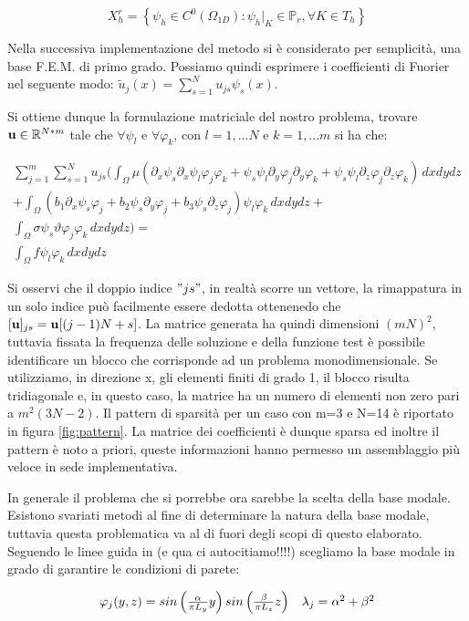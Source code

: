 \begin{displaymath}
X_h^r= \left\{\psi_h \in C^0(\Omega_{1D}): \psi_h \vert_K  \in \mathbb{P}_r,\forall K\in T_h \right\}
\end{displaymath}

 Nella successiva implementazione del metodo si \`e considerato per semplicit\`a, una base F.E.M. di primo grado. Possiamo quindi esprimere i coefficienti di Fuorier nel seguente modo: $\tilde{u}_j(x)=\sum_{s=1}^Nu_{js}\psi_s(x)$. 
 
 Si ottiene dunque la formulazione matriciale del nostro problema, trovare $\mathbf{u} \in \mathbb{R}^{N*m}$ tale che $\forall \psi_l$ e $\forall \varphi_k$, con $l=1,...N$ e $k=1,...m$ si ha che:

\begin{multline}
\sum_{j=1}^m \sum_{s=1}^N
u_{js} \Bigg( \int_\Omega\mu( \partial_x\psi_s \partial_x\psi_l\varphi _j\varphi _k + \psi_s \psi_l \partial_y\varphi _j\partial_y\varphi _k + \psi_s \psi_l \partial_z\varphi _j\partial_z\varphi _k)\,dxdydz \\
+ \int_\Omega (b_1\partial_x\psi_s\varphi _j+b_2\psi_s\partial_y\varphi _j + b_3\psi_s\partial_z\varphi_j)\psi_l\varphi _k\,dxdydz + \\ 
\int_\Omega \sigma\psi_s\vartheta\varphi _j\varphi _k\,dxdydz \Bigg) =\\
\int_\Omega f\psi_l\varphi _k\,dxdydz
\end{multline}

 Si osservi che il doppio indice $"js"$, in realt\`a scorre un vettore, la rimappatura in un solo indice pu\`o 
 facilmente essere dedotta ottenenedo che $[\mathbf{u}]_{js}=\mathbf{u}[(j-1)N+s]$. 
 La matrice generata ha quindi dimensioni $(mN)^2$, tuttavia fissata la frequenza delle soluzione e della funzione test \`e 
 possibile identificare un blocco che corrisponde ad un problema monodimensionale.
 Se utilizziamo, in direzione x, gli elementi finiti di grado 1, il blocco risulta tridiagonale e, in questo caso, la matrice ha un numero 
 di elementi non zero pari a $m^2(3N-2)$. Il pattern di sparsit\`a per un caso con m=3 e N=14 \`e riportato in figura \ref{fig:pattern}.
 La matrice dei coefficienti \`e dunque sparsa ed inoltre il pattern \`e noto a priori, queste 
 informazioni hanno permesso un assemblaggio pi\`u veloce in sede implementativa. 

In generale il problema che si porrebbe ora sarebbe la scelta della base modale. Esistono svariati metodi al fine di determinare la natura della base modale, tuttavia questa problematica va al di fuori degli scopi di questo elaborato. Seguendo le linee guida in (e qua ci autocitiamo!!!!) scegliamo la base modale in grado di garantire le condizioni di parete:

\begin{equation}
\label{eq:base modale}
\begin{array}{c c}
\varphi_j(y,z)=sin\left(\frac{\alpha}{\pi L_y}y\right)sin\left(\frac{\beta}{\pi L_z}z\right)
&
\lambda_j=\alpha^2+\beta^2
\end{array}
\end{equation}